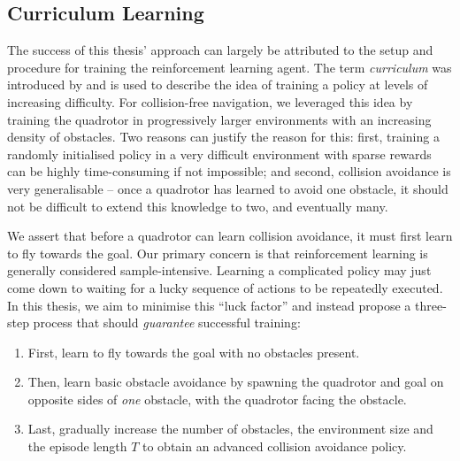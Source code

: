 \subsection{Curriculum Learning}
\label{subsec:5_curriculum}
The success of this thesis' approach can largely be attributed to the setup and procedure for training the reinforcement learning agent.
The term \textit{curriculum} was introduced by \cite{LearningWalkMassivelyParallel} and is used to describe the idea of training a policy at levels of increasing difficulty. For collision-free navigation, we leveraged this idea by training the quadrotor in progressively larger environments with an increasing density of obstacles. Two reasons can justify the reason for this: first, training a randomly initialised policy in a very difficult environment with sparse rewards can be highly time-consuming if not impossible; and second, collision avoidance is very generalisable -- once a quadrotor has learned to avoid one obstacle, it should not be difficult to extend this knowledge to two, and eventually many.

We assert that before a quadrotor can learn collision avoidance, it must first learn to fly towards the goal. Our primary concern is that reinforcement learning is generally considered sample-intensive. Learning a complicated policy may just come down to waiting for a lucky sequence of actions to be repeatedly executed. In this thesis, we aim to minimise this ``luck factor'' and instead propose a three-step process that should \textit{guarantee} successful training:
\begin{enumerate}
    \item First, learn to fly towards the goal with no obstacles present. 
    \item Then, learn basic obstacle avoidance by spawning the quadrotor and goal on opposite sides of \textit{one} obstacle, with the quadrotor facing the obstacle.
    \item Last, gradually increase the number of obstacles, the environment size and the episode length $T$ to obtain an advanced collision avoidance policy.
\end{enumerate}


